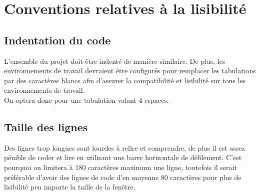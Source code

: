 \documentclass{article}
\begin{document}
    \section{Conventions relatives à la lisibilité}

        \subsection{Indentation du code}

            L'ensemble du projet doit être indenté de manière similaire. De plus, les environnements de travail devraient être configurés pour remplacer les tabulations par des caractères blancs afin d'assurer la compatibilité et lisibilité sur tous les environnements de travail. \\
            On optera donc pour une tabulation valant 4 espaces.

        \subsection{Taille des lignes}

            Des lignes trop longues sont lourdes à relire et comprendre, de plus il est assez pénible de coder et lire en utilisant une barre horizontale de défilement. C'est pourquoi on limitera à 180 caractères maximum une ligne, toutefois il serait préférable d'avoir des lignes de code d'en moyenne 80 caractères pour plus de lisibilité peu importe la taille de la fenêtre.
\end{document}
